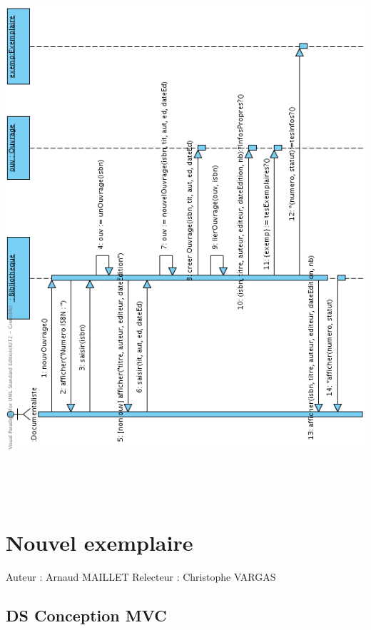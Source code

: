 \documentclass[a4paper,10pt]{report}
\begin{document}
\bigskip
\includegraphics[height=200mm]{NouvOuvNormal.png}
\newpage

\section*{Nouvel exemplaire}

Auteur : Arnaud MAILLET
Relecteur : Christophe VARGAS

\subsection*{DS Conception MVC}
\end{document}
